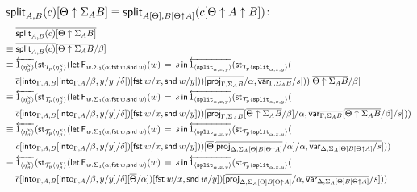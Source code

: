 \documentclass[10pt]{article}
\theoremstyle{definition}
\newcommand\dsd[1]{\ensuremath{\mathsf{#1}}}
\newcommand{\app}[2]{\ensuremath{#1 \: #2}}
\newcommand{\fst}[1]{\app{\dsd{fst}}{#1}}
\newcommand{\snd}[1]{\app{\dsd{snd}}{#1}}
\newcommand{\rewrite}[2]{\overleftarrow{#1}(#2)}
\newcommand\StI[2]{\ensuremath{\mathsf{st}_{#1}(#2)}}
\newcommand\FEs[4]{\ensuremath{\mathsf{let} \, \mathsf{F}_{#1}(#3) \, = \, {#2} \, \mathsf{in} \, #4}}
\newcommand\ApEl[2]{\mathcal{T}_{#1}\langle#2\rangle}
\begin{document}
\begin{enumerate}[style = multiline, labelwidth = 80pt]
\item[{$\mathsf{split}_{A,B}(c)[\Theta \uparrow \Sigma_A B] \equiv \mathsf{split}_{A[\Theta],B[\Theta \uparrow A]}(c[\Theta \uparrow A \uparrow B])$}:]
\begin{align*}
&\upstairs{\qsplit{A,B}(c)[\Theta \uparrow \Sigma_A B]} \\
\equiv{} &\upstairs{\qsplit{A,B}(c)}[\upstairs{\Theta \uparrow \Sigma_A B}/\beta] \\
\equiv{} &\rewrite{1_{\langle \eta^\chi_\beta \rangle}}{\StI{\ApEl{p}{\eta^\chi_\beta}}{\FEs{w. \Sigma_1(\alpha,\fst w, \snd w)}{s}{w}{\rewrite{\ApOne{\tsplit{\alpha,x,y}}}{\StI{\ApEl{p}{\tsplit{\alpha,x,y}}}{\\&\upstairs{c}[\into{\Gamma, A, B}[\into{\Gamma, A}/\beta, y/y] /\delta]}[\fst w/x, \snd w/y]}})[\upstairs{\proj{\Gamma, \Sigma_A B}}/\alpha, \upstairs{\qvar{\Gamma, \Sigma_A B}}/s]}}[\upstairs{\Theta \uparrow \Sigma_A B}/\beta] \\
\equiv{} &\rewrite{1_{\langle \eta^\chi_\beta \rangle}}{\StI{\ApEl{p}{\eta^\chi_\beta}}{\FEs{w. \Sigma_1(\alpha,\fst w, \snd w)}{s}{w}{\rewrite{\ApOne{\tsplit{\alpha,x,y}}}{\StI{\ApEl{p}{\tsplit{\alpha,x,y}}}{\\&\upstairs{c}[\into{\Gamma, A, B}[\into{\Gamma, A}/\beta, y/y] /\delta]}[\fst w/x, \snd w/y]}})[\upstairs{\proj{\Gamma, \Sigma_A B}}[\upstairs{\Theta \uparrow \Sigma_A B}/\beta]/\alpha, \upstairs{\qvar{\Gamma, \Sigma_A B}}[\upstairs{\Theta \uparrow \Sigma_A B}/\beta]/s]}} \\
\equiv{} &\rewrite{1_{\langle \eta^\chi_\beta \rangle}}{\StI{\ApEl{p}{\eta^\chi_\beta}}{\FEs{w. \Sigma_1(\alpha,\fst w, \snd w)}{s}{w}{\rewrite{\ApOne{\tsplit{\alpha,x,y}}}{\StI{\ApEl{p}{\tsplit{\alpha,x,y}}}{\\&\upstairs{c}[\into{\Gamma, A, B}[\into{\Gamma, A}/\beta, y/y] /\delta]}[\fst w/x, \snd w/y]}})[\upstairs{\Theta}[\upstairs{\proj{\Delta, \Sigma_A[\Theta] B[\Theta \uparrow A]}}/\alpha]/\alpha, \upstairs{\qvar{\Delta, \Sigma_A[\Theta] B[\Theta \uparrow A]}/s}]}} \\
\equiv{} &\rewrite{1_{\langle \eta^\chi_\beta \rangle}}{\StI{\ApEl{p}{\eta^\chi_\beta}}{\FEs{w. \Sigma_1(\alpha,\fst w, \snd w)}{s}{w}{\rewrite{\ApOne{\tsplit{\alpha,x,y}}}{\StI{\ApEl{p}{\tsplit{\alpha,x,y}}}{\\&\upstairs{c}[\into{\Gamma, A, B}[\into{\Gamma, A}/\beta, y/y] /\delta][\upstairs{\Theta}/\alpha]}[\fst w/x, \snd w/y]}}[\upstairs{\proj{\Delta, \Sigma_A[\Theta] B[\Theta \uparrow A]}}/\alpha, \upstairs{\qvar{\Delta, \Sigma_A[\Theta] B[\Theta \uparrow A]}}/s]}} \\

\end{align*}
\end{enumerate}
\end{document}
